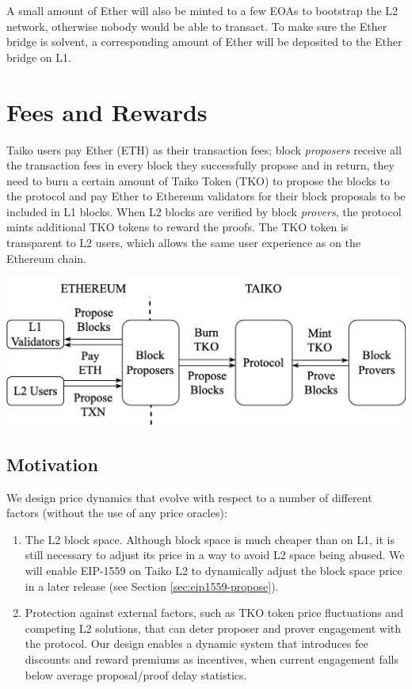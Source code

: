 \documentclass[9pt,oneside]{amsart}
\newenvironment{Figure}
  {\par\medskip\noindent\minipage{\linewidth}}
  {\endminipage\par\medskip}
\begin{document}
\begin{multicols}{2}
A small amount of Ether will also be minted to a few EOAs to bootstrap the L2 network, otherwise nobody would be able to transact. To make sure the Ether bridge is solvent, a corresponding amount of Ether will be deposited to the Ether bridge on L1.

\section{Fees and Rewards}\label{sec:tokenomics}

Taiko users pay Ether (ETH) as their transaction fees; block \emph{proposers} receive all the transaction fees in every block they successfully propose and in return, they need to burn a certain amount of Taiko Token (TKO) to propose the blocks to the protocol and pay Ether to Ethereum validators for their block proposals to be included in L1 blocks. When L2 blocks are verified by block \emph{provers}, the protocol mints additional TKO tokens to reward the proofs. The TKO token is transparent to L2 users, which allows the same user experience as on the Ethereum chain.

\begin{Figure}
 \centering
 \includegraphics[width=\linewidth]{fig/taikoEcosystemFin2.png}
 \label{fig:taiExchange}
 
\end{Figure}


\subsection{Motivation}
We design price dynamics that evolve with respect to a number of different factors (without the use of any price oracles):
\begin{enumerate}
\item The L2 block space. Although block space is much cheaper than on L1, it is still necessary to adjust its price in a way to avoid L2 space being abused. We will enable EIP-1559 on Taiko L2 to dynamically adjust the block space price in a later release (see Section \ref{sec:eip1559-propose}).
\item Protection against external factors, such as TKO token price fluctuations and competing L2 solutions, that can deter proposer and prover engagement with the protocol. Our design enables a dynamic system that introduces fee discounts and reward premiums as incentives, when current engagement falls below average proposal/proof delay statistics. 


\end{enumerate}
\end{multicols}
\end{document}
